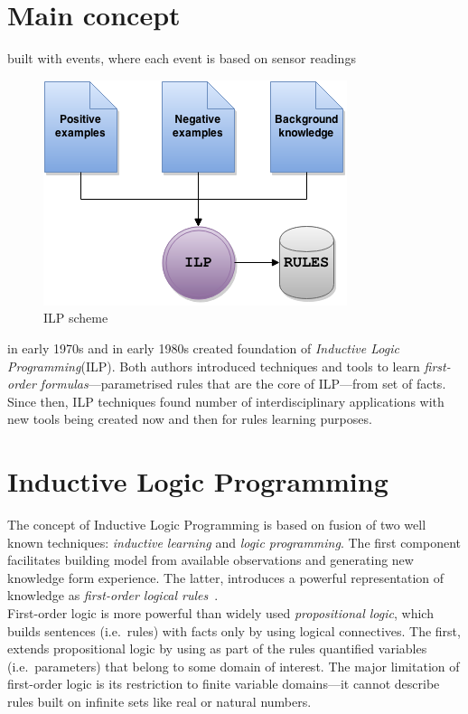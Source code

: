 \documentclass[12pt, a4paper, pdflatex, leqno, twoside, openright]{report}
\begin{document}
  \section{Main concept}
  built with events, where each event is based on sensor readings

\begin{figure}
  \centering
  \includegraphics[scale=.5]{./gfx/ilp}
  \caption{ILP scheme\label{fig:ilp}}
\end{figure}

\citeauthor{plotkin1972automatic} in early 1970s and \citeauthor{shapiro1983algorithmic} in early 1980s created foundation of \emph{Inductive Logic Programming}(ILP). Both authors introduced techniques and tools to learn \emph{first-order formulas}---parametrised rules that are the core of ILP---from set of facts. Since then, ILP techniques found number of interdisciplinary applications with new tools being created now and then for rules learning purposes.

  \section{Inductive Logic Programming}
The concept of Inductive Logic Programming is based on fusion of two well known techniques: \emph{inductive learning} and \emph{logic programming}. The first component facilitates building model from available observations and generating new knowledge form experience. The latter, introduces a powerful representation of knowledge as \emph{first-order logical rules}~\citep{muggleton1994inductive,muggleton1995inverse}.\\

First-order logic is more powerful than widely used \emph{propositional logic}, which builds sentences (i.e.\ rules) with facts only by using logical connectives. The first, extends propositional logic by using as part of the rules quantified variables (i.e.\ parameters) that belong to some domain of interest. The major limitation of first-order logic is its restriction to finite variable domains---it cannot describe rules built on infinite sets like real or natural numbers.\\ %
\end{document}
